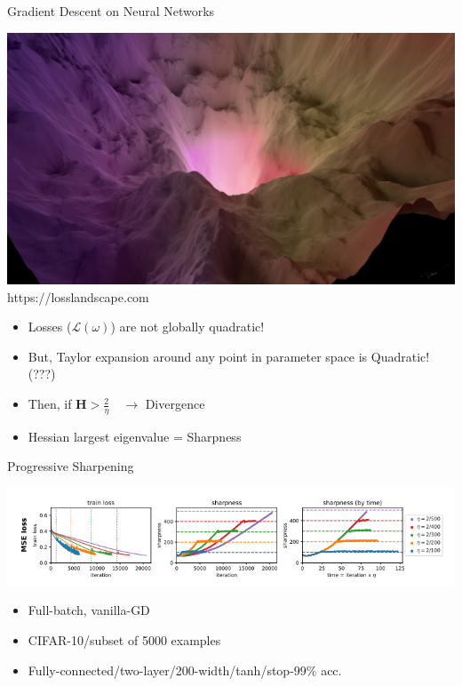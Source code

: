 \documentclass[aspectratio=169]{beamer}
\begin{document}
\begin{frame}{Gradient Descent on Neural Networks}
	\begin{minipage}{0.5\textwidth}
    \includegraphics[width=\textwidth]{Figures/loss.jpeg}
    \center
    \color{Pink}https://losslandscape.com
	\end{minipage}%
	\begin{minipage}{0.5\textwidth}
    \begin{itemize}
      \item Losses ($\mathcal{L}(\omega)$) are not globally quadratic!
      \item But, Taylor expansion around any point in parameter space is Quadratic! (???)
      \item Then, if $\mathbf{H}>\frac{2}{\eta}\quad\to$ \color{Pink} Divergence
      \item \color{Black}Hessian largest eigenvalue = Sharpness
    \end{itemize}
	\end{minipage}
\end{frame}

\begin{frame}{Progressive Sharpening}
	\begin{minipage}{\textwidth}
    \includegraphics[width=\textwidth]{Figures/prog_sharp.png}
	\end{minipage}
	\begin{minipage}{\textwidth}
    \begin{itemize}
      \item Full-batch, vanilla-GD
      \item CIFAR-10/subset of 5000 examples
      \item Fully-connected/two-layer/200-width/tanh/stop-$99\%$ acc.
    \end{itemize}
	\end{minipage}
\end{frame}
\end{document}
